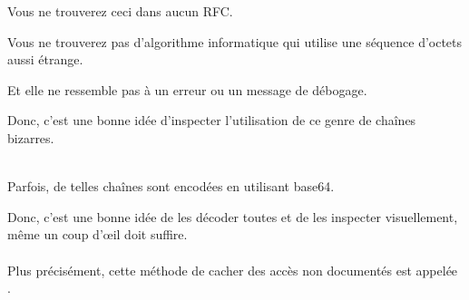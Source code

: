 Vous ne trouverez ceci dans aucun \ac{RFC}.

Vous ne trouverez pas d'algorithme informatique qui utilise une séquence d'octets
aussi étrange.

Et elle ne ressemble pas à un erreur ou un message de débogage.

Donc, c'est une bonne idée d'inspecter l'utilisation de ce genre de chaînes bizarres.\\
\\

Parfois, de telles chaînes sont encodées en utilisant base64.

Donc, c'est une bonne idée de les décoder toutes et de les inspecter visuellement,
même un coup d'\oe{}il doit suffire.\\
\\
Plus précisément, cette méthode de cacher des accès non documentés est appelée .

